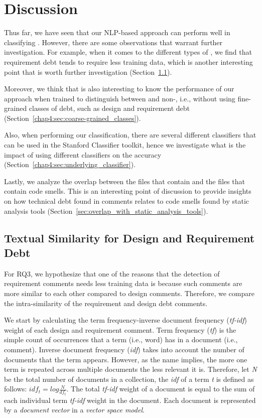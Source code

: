 \section{Discussion}
\label{chap4:sec:discussion}

Thus far, we have seen that our NLP-based approach can perform well in classifying \SATD. However, there are some observations that warrant further investigation. For example, when it comes to the different types of \SATD, we find that requirement debt tends to require less training data, which is another interesting point that is worth further investigation (Section~\ref{chap4:sec:textual_similarity}). 

Moreover, we think that is also interesting to know the performance of our approach when trained to distinguish between \SATD and non-\SATD, i.e., without using fine-grained classes of debt, such as design and requirement debt (Section~\ref{chap4:sec:coarse-grained_classes}).

Also, when performing our classification, there are several different classifiers that can be used in the Stanford Classifier toolkit, hence we investigate what is the impact of using different classifiers on the accuracy (Section~\ref{chap4:sec:underlying_classifier}).

Lastly, we analyze the overlap between the files that contain \SATD and the files that contain code smells. This is an interesting point of discussion to provide insights on how technical debt found in comments relates to code smells found by static analysis tools (Section~\ref{sec:overlap_with_static_analysis_tools}).


\subsection{Textual Similarity for Design and Requirement Debt}
\label{chap4:sec:textual_similarity}
For RQ3, we hypothesize that one of the reasons that the detection of requirement \SATD comments needs less training data is because such comments are more similar to each other compared to design \SATD comments. Therefore, we compare the intra-similarity of the requirement and design debt comments.

We start by calculating the term frequency-inverse document frequency (\textit{tf-idf}) weight of each design and requirement \SATD comment. Term frequency (\textit{tf}) is the simple count of occurrences that a term (i.e., word) has in a document (i.e., comment). Inverse document frequency (\textit{idf}) takes into account the number of documents that the term appears. However, as the name implies, the more one term is repeated across multiple documents the less relevant it is. Therefore, let \textit{N} be the total number of documents in a collection, the \textit{idf} of a term \textit{t} is defined as follows: \(idf_{t} = log\frac{N}{df_{t}}\). The total \textit{tf-idf} weight of a document is equal to the sum of each individual term \textit{tf-idf} weight in the document. Each document is represented by a \textit{document vector} in a \textit{vector space model}. 

